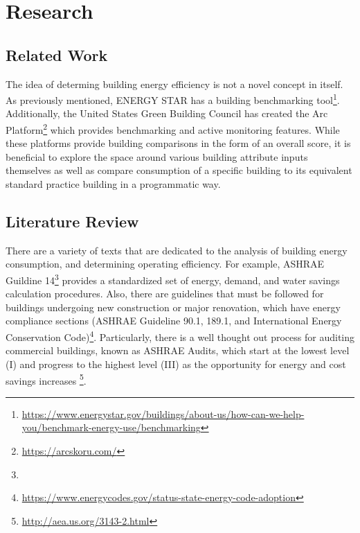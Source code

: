 \section{Research}
\label{sec:literature_review}

\subsection{Related Work}
The idea of determing building energy efficiency is not a novel concept in itself.  As previously mentioned, ENERGY STAR has a building benchmarking tool\footnote{\href{https://www.energystar.gov/buildings/about-us/how-can-we-help-you/benchmark-energy-use/benchmarking }{\url{https://www.energystar.gov/buildings/about-us/how-can-we-help-you/benchmark-energy-use/benchmarking}}}.  Additionally, the United States Green Building Council has created the Arc Platform\footnote{\href{https://arcskoru.com/}{\url{https://arcskoru.com/}}} which provides benchmarking and active monitoring features.  While these platforms provide building comparisons in the form of an overall score, it is beneficial to explore the space around various building attribute inputs themselves as well as compare consumption of a specific building to its equivalent standard practice building in a programmatic way.

\subsection{Literature Review}

There are a variety of texts that are dedicated to the analysis of building energy consumption, and determining operating efficiency.  For example, ASHRAE Guildine 14\footnote{} provides a standardized set of energy, demand, and water savings calculation procedures.  Also, there are guidelines that must be followed for buildings undergoing new construction or major renovation, which have energy compliance sections (ASHRAE Guideline 90.1, 189.1, and International Energy Conservation Code)\footnote{\href{https://www.energycodes.gov/status-state-energy-code-adoption}{\url{https://www.energycodes.gov/status-state-energy-code-adoption}}}.  Particularly, there is a well thought out process for auditing commercial buildings, known as ASHRAE Audits, which start at the lowest level (I) and progress to the highest level (III) as the opportunity for energy and cost savings increases \footnote{\href{http://aea.us.org/3143-2.html}{\url{http://aea.us.org/3143-2.html}}}.  